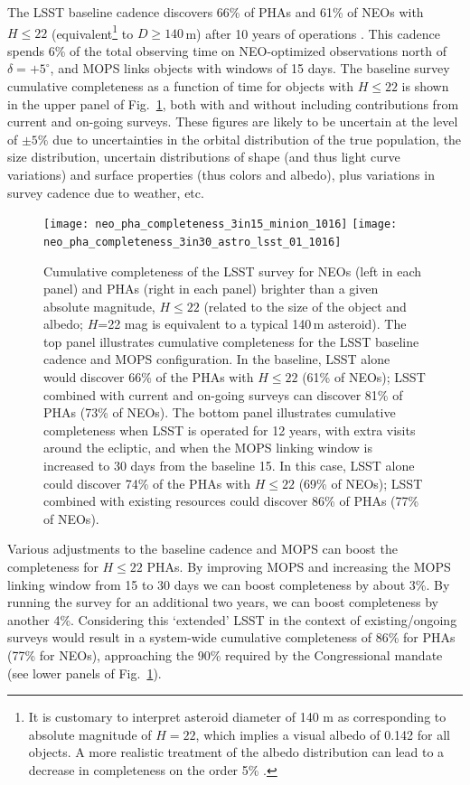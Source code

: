 The LSST baseline cadence discovers 66\% of PHAs and 61\% of NEOs with $H\leq22$ 
(equivalent\footnote{It is customary to interpret asteroid diameter of 140 m as corresponding to 
absolute magnitude of $H=22$, which implies a visual albedo of 0.142 for all objects. A more 
realistic treatment of the albedo distribution can lead to a decrease in completeness on the order
5\% \citep{2016AJ....152...79W, 2016AJ....151..172G}.}  to $D\ge140$\,m)
after 10 years of operations \citep{2018Icar..303..181J}.  This cadence spends 6\% of the total
observing time on NEO-optimized observations north of $\delta = +5^\circ$, and MOPS links objects with windows of 15 days.
The baseline survey cumulative completeness as a function of time for objects with $H\le22$ is shown in the upper panel of Fig.~\ref{Fig:Cneo},
both with and without including contributions from current and
on-going surveys. These figures are likely to be uncertain at the level of $\pm5\%$ due
to uncertainties in the orbital distribution of the true population, the size distribution, uncertain distributions of shape
(and thus light curve variations) and surface properties (thus colors and albedo), plus variations in survey cadence due to
weather, etc.

\begin{figure}
\texttt{[image: neo\_pha\_completeness\_3in15\_minion\_1016]}
\texttt{[image: neo\_pha\_completeness\_3in30\_astro\_lsst\_01\_1016]}
\caption{Cumulative completeness of the LSST survey for NEOs (left in each panel) and PHAs (right in each panel)
brighter than a given absolute magnitude, $H\le22$ (related to the size of the object and albedo;
$H$=22 mag is equivalent to a typical 140\,m asteroid). The top panel illustrates cumulative completeness
for the LSST baseline cadence and MOPS configuration. In the baseline, LSST alone would discover 66\% of the PHAs
with $H\le22$ (61\% of NEOs); LSST combined with current and on-going
surveys
can discover 81\% of PHAs (73\% of NEOs). The bottom panel illustrates cumulative
completeness when LSST is operated for 12 years, with extra visits around the ecliptic, and when the MOPS linking
window is increased to 30 days from the baseline 15. In this case, LSST alone could discover 74\% of the PHAs with
$H\le22$ (69\% of NEOs); LSST combined with existing resources could discover 86\% of PHAs (77\% of NEOs).
}
\label{Fig:Cneo}
\end{figure}

Various adjustments to the baseline cadence and MOPS can boost the completeness for $H\le22$ PHAs.
By improving MOPS and increasing the MOPS linking window from 15 to 30 days we can boost completeness
by about 3\%. By running the survey for an additional two years, we can boost completeness by another 4\%.
Considering this `extended' LSST in the context of existing/ongoing surveys would result in a system-wide cumulative completeness of 86\% for PHAs (77\% for NEOs), approaching the 90\% required by the Congressional mandate (see
lower panels of Fig.~\ref{Fig:Cneo}).

